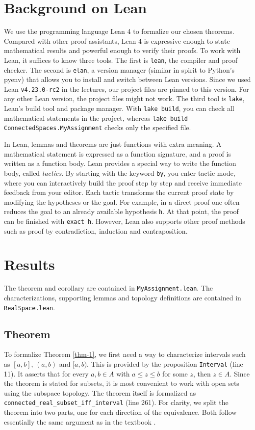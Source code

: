 \documentclass[11pt, oneside]{article}
\theoremstyle{plain}
\theoremstyle{definition}
\begin{document}
\section{Background on Lean}
We use the programming language Lean 4 \cite{lean} to formalize our chosen theorems. Compared with other proof assistants, Lean 4 is expressive enough to state mathematical results and powerful enough to verify their proofs.
To work with Lean, it suffices to know three tools. The first is \verb|lean|, the compiler and proof checker. The second is \verb|elan|, a version manager (similar in spirit to Python’s pyenv) that allows you to install and switch between Lean versions. Since we used Lean \verb|v4.23.0-rc2| in the lectures, our project files are pinned to this version. For any other Lean version, the project files might not work. The third tool is \verb|lake|, Lean’s build tool and package manager.
With \verb|lake build|, you can check all mathematical statements in the project, whereas \verb|lake build ConnectedSpaces.MyAssignment| checks only the specified file.

In Lean, lemmas and theorems are just functions with extra meaning. A mathematical statement is expressed as a function signature, and a proof is written as a function body.
Lean provides a special way to write the function body, called \textit{tactics}. By starting with the keyword \verb|by|, you enter tactic mode, where you can interactively build the proof step by step and receive immediate feedback from your editor. Each tactic transforms the current proof state by modifying the hypotheses or the goal.
For example, in a direct proof one often reduces the goal to an already available hypothesis \verb|h|. At that point, the proof can be finished with \verb|exact h|. However, Lean also supports other proof methods such as proof by contradiction, induction and contraposition.

\section{Results}
The theorem and corollary are contained in \verb|MyAssignment.lean|. The characterizations, supporting lemmas and topology definitions are contained in \verb|RealSpace.lean|.

\subsection{Theorem}
To formalize Theorem \ref{thm-1}, we first need a way to characterize intervals such as $[a,b]$, $(a,b)$ and $[a,b)$. This is provided by the proposition \verb|Interval| (line 11). It asserts that for every $a,b \in A$ with $a \le z \le b$ for some $z$, then $z \in A$.
Since the theorem is stated for subsets, it is most convenient to work with open sets using the subspace topology. The theorem itself is formalized as \verb|connected_real_subset_iff_interval| (line 261). For clarity, we split the theorem into two parts, one for each direction of the equivalence. Both follow essentially the same argument as in the textbook \cite{topoBook}.
\end{document}
